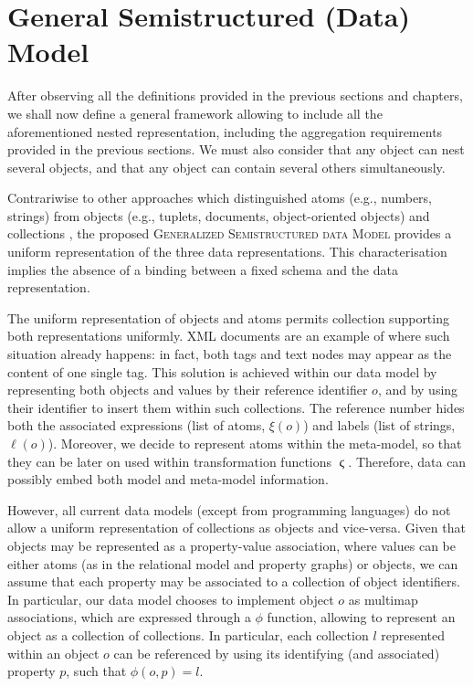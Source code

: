 
\section{General Semistructured (Data) Model}\label{def:mofgeneral}
After observing all the definitions provided in the previous sections and chapters, we shall now define a general framework allowing to include all the aforementioned nested representation, including the aggregation requirements provided in the previous sections. We must also consider that any object can nest several objects, and that any object can contain several others simultaneously. 

Contrariwise to other approaches which distinguished atoms (e.g., numbers, strings) from objects (e.g., tuplets, documents, object-oriented objects) and collections \cite{Magnani06}, the proposed \textsc{Generalized Semistructured data Model} provides a uniform representation of the three data representations. This characterisation implies the absence of a binding between a fixed schema and the data representation.

The uniform representation of objects and atoms permits collection supporting both representations uniformly. XML documents are an example of where such situation already happens: in fact, both tags and text nodes may appear as the content of one single tag. This solution is achieved within our data model by representing both objects and values by their reference identifier $o$, and by using their identifier to insert them within such collections. The reference number hides both the associated expressions (list of atoms, $\xi(o)$) and labels (list of strings, $\ell(o)$). Moreover, we decide to represent atoms within the meta-model, so that they can be later on used within transformation functions $\stigma$. Therefore, data can possibly embed both model and meta-model information.

However, all current data models (except from programming languages) do not allow a uniform representation of collections as objects and vice-versa. Given that objects may be represented as a property-value association, where values can be either atoms (as in the relational model and property graphs) or objects, we can assume that each property may be associated to a collection of object identifiers. In particular, our data model chooses to implement object $o$ as multimap associations, which are expressed through a $\phi$ function, allowing to represent an object as a collection of collections. In particular, each collection $l$ represented within an object $o$ can be referenced by using its identifying (and associated) property $p$, such that $\phi(o,p)=l$.


